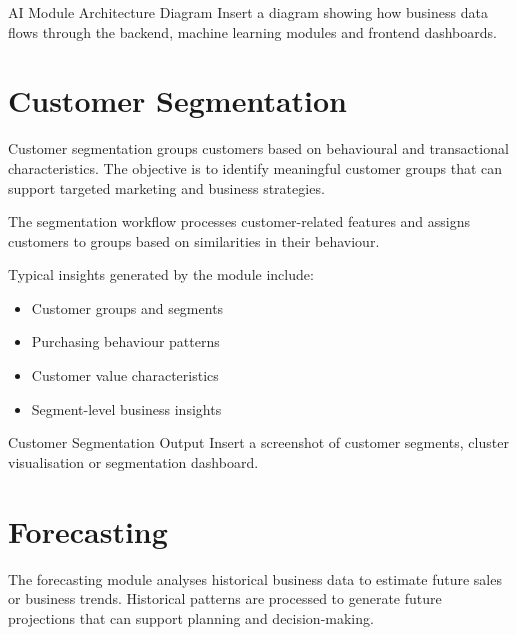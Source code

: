 \documentclass[12pt,a4paper]{report}
\begin{document}
\begin{screenshotplaceholder}{AI Module Architecture Diagram}
Insert a diagram showing how business data flows through the backend,
machine learning modules and frontend dashboards.
\end{screenshotplaceholder}


\section{Customer Segmentation}

Customer segmentation groups customers based on behavioural and
transactional characteristics. The objective is to identify meaningful
customer groups that can support targeted marketing and business
strategies.

The segmentation workflow processes customer-related features and
assigns customers to groups based on similarities in their behaviour.

Typical insights generated by the module include:

\begin{itemize}
    \item Customer groups and segments
    \item Purchasing behaviour patterns
    \item Customer value characteristics
    \item Segment-level business insights
\end{itemize}

\begin{screenshotplaceholder}{Customer Segmentation Output}
Insert a screenshot of customer segments, cluster visualisation or
segmentation dashboard.
\end{screenshotplaceholder}


\section{Forecasting}

The forecasting module analyses historical business data to estimate
future sales or business trends. Historical patterns are processed to
generate future projections that can support planning and
decision-making.
\end{document}
